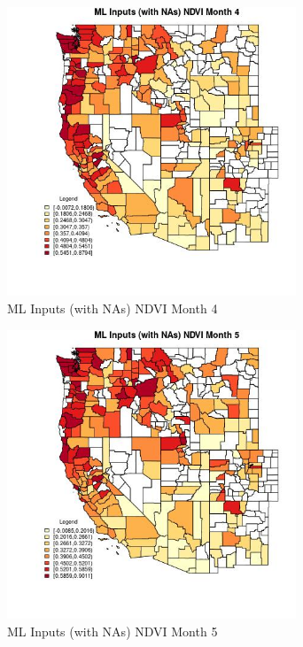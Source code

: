 \begin{figure} 
\centering  
\includegraphics[width=0.77\textwidth]{Code_Outputs/Report_ML_input_PM25_Step4_part_f_de_duplicated_aves_prioritize_24hr_obswNAs_CountyNDVImedianMonth4.jpg} 
\caption{\label{fig:Report_ML_input_PM25_Step4_part_f_de_duplicated_aves_prioritize_24hr_obswNAsCountyNDVImedianMonth4}ML Inputs (with NAs) NDVI Month 4} 
\end{figure} 
 

\clearpage 

\begin{figure} 
\centering  
\includegraphics[width=0.77\textwidth]{Code_Outputs/Report_ML_input_PM25_Step4_part_f_de_duplicated_aves_prioritize_24hr_obswNAs_CountyNDVImedianMonth5.jpg} 
\caption{\label{fig:Report_ML_input_PM25_Step4_part_f_de_duplicated_aves_prioritize_24hr_obswNAsCountyNDVImedianMonth5}ML Inputs (with NAs) NDVI Month 5} 
\end{figure} 
 

